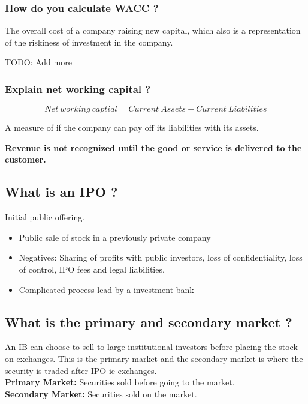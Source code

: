 \documentclass[11pt]{scrartcl} %
\begin{document}
\subsubsection{How do you calculate WACC ?}

The overall cost of a company raising new capital, which also is a representation of the riskiness of investment in the company.

TODO: Add more

\subsubsection{Explain net working capital ?}

\[ Net\:working\:captial = Current\:Assets - Current\:Liabilities \]

A measure of if the company can pay off its liabilities with its assets. 

\textbf{Revenue is not recognized until the good or service is delivered to the customer.}

\subsection{What is an IPO ?}

Initial public offering.

\begin{itemize}
	\item Public sale of stock in a previously private company
	\item Negatives: Sharing of profits with public investors, loss of confidentiality, loss of control, IPO fees and legal liabilities.
	\item Complicated process lead by a investment bank
\end{itemize}

\subsection{What is the primary and secondary market ?}

An IB can choose to sell to large institutional investors before placing the stock on exchanges. This is the primary market and the secondary market is where the security is traded after IPO ie exchanges. \\

\textbf{Primary Market:} Securities sold before going to the market. \\

\textbf{Secondary Market:} Securities sold on the market. \\
\end{document}
